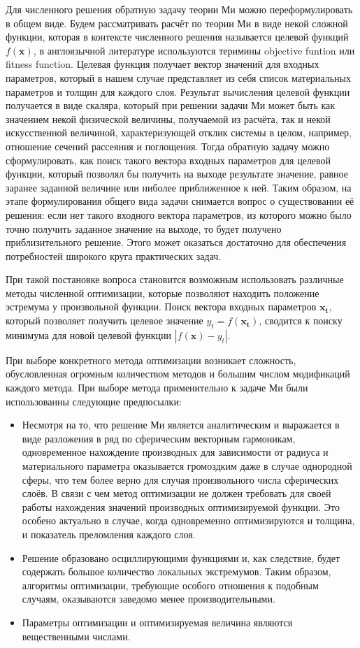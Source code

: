 Для численного решения обратную задачу теории Ми можно
переформулировать в общем виде. Будем рассматривать расчёт по теории
Ми в виде некой сложной функции, которая в контексте численного
решения называется целевой функций $f(\mathbf{x})$, в англоязычной литературе
используются теримины objective funtion или fitness function.  Целевая
функция получает вектор значений для входных параметров, который в
нашем случае представляет из себя список материальных параметров и
толщин для каждого слоя. Результат вычисления целевой функции
получается в виде скаляра, который при решении задачи Ми может быть
как значением некой физической величины, получаемой из расчёта, так и
некой искусственной величиной, характеризующей отклик системы в целом,
например, отношение сечений рассеяния и поглощения. Тогда обратную
задачу можно сформулировать, как поиск такого вектора входных
параметров для целевой функции, который позволял бы получить на выходе
результате значение, равное заранее заданной величине или ниболее
приближенное к ней. Таким образом, на этапе формулирования общего вида
задачи снимается вопрос о существовании её решения: если нет такого
входного вектора параметров, из которого можно было точно получить
заданное значение на выходе, то будет получено приблизительного
решение. Этого может оказаться достаточно для обеспечения потребностей
широкого круга практических задач.

При такой постановке вопроса становится возможным использовать
различные методы численной оптимизации, которые позволяют находить
положение эстремума у произвольной функции. Поиск вектора входных
параметров $\mathbf{x_t}$, который позволяет получить целевое
значение $y_t=f(\mathbf{x_t})$, сводится к поиску минимума для новой
целевой функции $\left|f(\mathbf{x})-y_t\right|$. 

При выборе конкретного метода оптимизации возникает сложность,
обусловленная огромным количеством методов и большим числом
модификаций каждого метода. При выборе метода применительно к задаче
Ми были использованны следующие предпосылки:
\begin{itemize}
\item Несмотря на то, что решение Ми является аналитическим и
  выражается в виде разложения в ряд по сферическим векторным
  гармоникам, одновременное нахождение производных для зависимости от
  радиуса и материального параметра оказывается громоздким даже в
  случае однородной сферы, что тем более верно для случая
  произвольного числа сферических слоёв.  В связи с чем метод
  оптимизации не должен требовать для своей работы нахождения значений
  производных оптимизируемой функции.  Это особено актуально в случае,
  когда одновременно оптимизируются и толщина, и показатель
  преломления каждого слоя.
\item Решение образовано осциллирующими функциями и, как
  следствие, будет содержать большое количество локальных
  экстремумов. Таким образом, алгоритмы оптимизации, требующие особого
  отношения к подобным случаям, оказываются заведомо менее
  производительными.
\item Параметры оптимизации и оптимизируемая величина являются
  вещественными числами.
\end{itemize}

